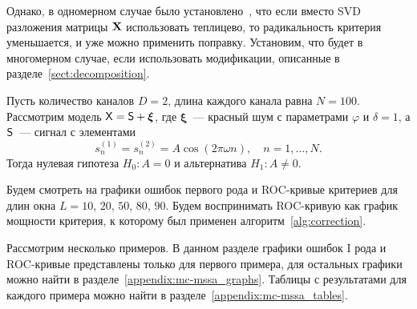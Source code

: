 \documentclass[specialist,
substylefile = spbu.rtx,
               subf,href,colorlinks=true,12pt]{disser}
\theoremstyle{definition}
\newcommand{\bfxi}{\boldsymbol{\xi}}
\begin{document}
Однако, в одномерном случае было установлено~\cite{Larin2022}, что если вместо SVD разложения матрицы $\mathbf{X}$ использовать теплицево, то радикальность критерия уменьшается, и уже можно применить поправку. Установим, что будет в многомерном случае, если использовать модификации, описанные в разделе~\ref{sect:decomposition}.

Пусть количество каналов $D=2$, длина каждого канала равна $N=100$. Рассмотрим модель $\tX=\tS+\bfxi$, где $\bfxi$~--- красный шум с параметрами $\varphi$ и $\delta=1$, а $\mathsf{S}$~--- сигнал с элементами
\[
s_n^{(1)}=s_n^{(2)}=A\cos(2\pi\omega n),\quad n=1,\ldots, N.
\]
Тогда нулевая гипотеза $H_0:A=0$ и альтернатива $H_1:A\ne0$.

Будем смотреть на графики ошибок первого рода и ROC-кривые критериев для длин окна $L=10$, $20$, $50$, $80$, $90$. Будем воспринимать ROC-кривую как график мощности критерия, к которому был применен алгоритм~\ref{alg:correction}.

Рассмотрим несколько примеров. В данном разделе графики ошибок I рода и ROC-кривые представлены только для первого примера, для остальных графики можно найти в разделе~\ref{appendix:mc-mssa_graphs}. Таблицы с результатами для каждого примера можно найти в разделе~\ref{appendix:mc-mssa_tables}.
\end{document}
